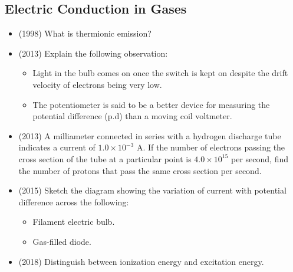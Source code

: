 \documentclass{article}
\begin{document}
\subsection{Electric Conduction in Gases}
\begin{itemize}
\item (1998)  What is thermionic emission?
\item (2013)  Explain the following observation:\begin{itemize}
\item Light in the bulb comes on once the switch is kept on despite the drift velocity of electrons being very low.
\item The potentiometer is said to be a better device for measuring the potential difference (p.d) than a moving coil voltmeter.
\end{itemize}
\item (2013)  A milliameter connected in series with a hydrogen discharge tube indicates a current of $ 1.0 \times 10^{-3}$ A. If the number of electrons passing the cross section of the tube at a particular point is $ 4.0 \times 10^{15}$ per second, find the number of protons that pass the same cross section per second. 
\item (2015)  Sketch the diagram showing the variation of current with potential difference across the following:\begin{itemize}
\item  Filament electric bulb. 
\item Gas-filled diode. 
\end{itemize}
\item (2018)  Distinguish between ionization energy and excitation energy.
\end{itemize}
\end{document}
